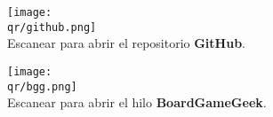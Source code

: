 \bigbreak

\begin{multicols}{2}
\centering
\texttt{[image: \\qr/github.png]}\\
Escanear para abrir el repositorio \textbf{GitHub}.

\columnbreak

\texttt{[image: \\qr/bgg.png]}\\
Escanear para abrir el hilo \textbf{BoardGameGeek}.
\end{multicols}
